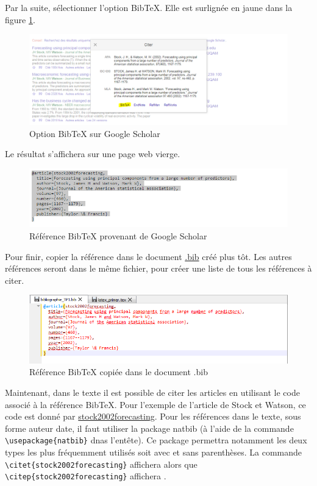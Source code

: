 \documentclass[12pt]{article}
\begin{document}
	Par la suite, sélectionner l'option BibTeX. Elle est surlignée en jaune dans la figure \ref{optionbib}.
	\begin{figure}[H]
		\includegraphics[width=5.5in]{googleScholar2.png}
		\caption{Option BibTeX sur Google Scholar}
		\label{optionbib}
	\end{figure}
	
	Le résultat s'affichera sur une page web vierge.
	
	\begin{figure}[H]
		\includegraphics[width=5.5in]{googleScholar3.png}
		\caption{Référence BibTeX provenant de Google Scholar}
		\label{gscholar}
	\end{figure}
	
	Pour finir, copier la référence dans le document \url{.bib} créé plus tôt. Les autres références seront dans le même fichier, pour créer une liste de tous les références à citer.
	
	\begin{figure}[H]
		\includegraphics[width=5.5in]{googleScholar4.png}
		\caption{Référence BibTeX copiée dans le document .bib}
	\end{figure}
	
	Maintenant, dans le texte il est possible de citer les articles en utilisant le code associé à la référence BibTeX. Pour l'exemple de l'article de Stock et Watson, ce code est donné par \url{stock2002forecasting}. Pour les références dans le texte, sous forme auteur date, il faut utiliser la package natbib (à l'aide de la commande \lstinline|\usepackage{natbib}| dnas l'entête). Ce package permettra notamment les deux types les plus fréquemment utilisés soit avec et sans parenthèses. La commande \lstinline|\citet{stock2002forecasting}| affichera \citet{cit1} alors que \lstinline|\citep{stock2002forecasting}| affichera \citep{cit1}. 
	
	\clearpage
	
	
	
\end{document}
